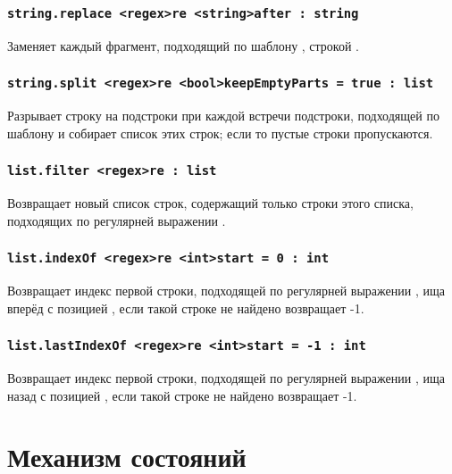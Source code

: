 \documentclass[a4paper, 14pt]{extarticle}
\begin{document}
\subsubsection{\lstinline|string.replace <regex>re <string>after : string|}

Заменяет каждый фрагмент, подходящий по шаблону , строкой .

\subsubsection{\lstinline|string.split <regex>re <bool>keepEmptyParts = true : list|}

Разрывает строку на подстроки при каждой встречи подстроки, подходящей по шаблону  и собирает список этих строк; если  то пустые строки пропускаются.

\subsubsection{\lstinline|list.filter <regex>re : list|}

Возвращает новый список строк, содержащий только строки этого списка, подходящих по регулярней выражении .

\subsubsection{\lstinline|list.indexOf <regex>re <int>start = 0 : int|}

Возвращает индекс первой строки, подходящей по регулярней выражении , ища вперёд с позицией , если такой строке не найдено возвращает -1.

\subsubsection{\lstinline|list.lastIndexOf <regex>re <int>start = -1 : int|}

Возвращает индекс первой строки, подходящей по регулярней выражении , ища назад с позицией , если такой строке не найдено возвращает -1.


\newpage
\section{Механизм состояний}
\end{document}
